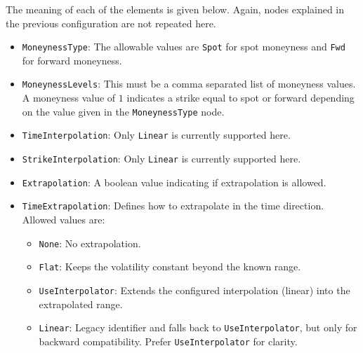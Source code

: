 The meaning of each of the elements is given below. Again, nodes explained in the previous configuration are not repeated here.
\begin{itemize}
\item \lstinline!MoneynessType!:
The allowable values are \lstinline!Spot! for spot moneyness and \lstinline!Fwd! for forward moneyness.

\item \lstinline!MoneynessLevels!:
This must be a comma separated list of moneyness values. A moneyness value of $1$ indicates a strike equal to spot or forward depending on the value given in the \lstinline!MoneynessType! node.

\item \lstinline!TimeInterpolation!:
Only \lstinline!Linear! is currently supported here.

\item \lstinline!StrikeInterpolation!:
Only \lstinline!Linear! is currently supported here.

\item \lstinline!Extrapolation!:
A boolean value indicating if extrapolation is allowed.

\item \lstinline!TimeExtrapolation!:
Defines how to extrapolate in the time direction. Allowed values are:
  \begin{itemize}
    \item \lstinline!None!: No extrapolation.
    \item \lstinline!Flat!: Keeps the volatility constant beyond the known range.
    \item \lstinline!UseInterpolator!: Extends the configured interpolation (linear) into the extrapolated range.
    \item \lstinline!Linear!: Legacy identifier and falls back to \lstinline!UseInterpolator!, but only for backward compatibility. Prefer \lstinline!UseInterpolator! for clarity.
  \end{itemize}
  

\end{itemize}
